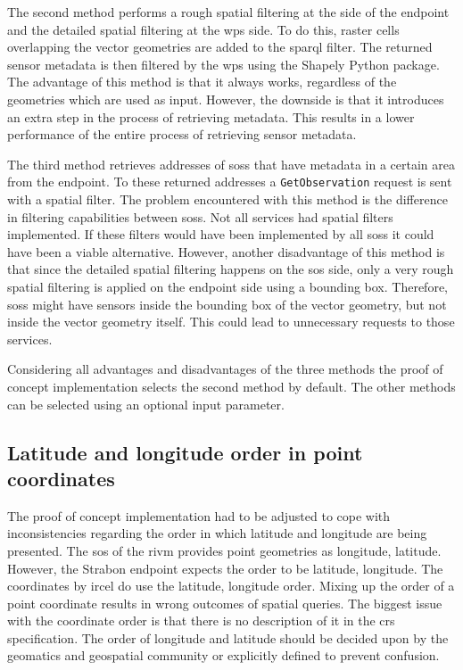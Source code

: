 The second method performs a rough spatial filtering at the side of the endpoint and the detailed spatial filtering at the \ac{wps} side. To do this, raster cells overlapping the vector geometries are added to the \ac{sparql} filter. The returned sensor metadata is then filtered by the \ac{wps} using the Shapely Python package. The advantage of this method is that it always works, regardless of the geometries which are used as input. However, the downside is that it introduces an extra step in the process of retrieving metadata. This results in a lower performance of the entire process of retrieving sensor metadata.  

The third method retrieves addresses of \aclp{sos} that have metadata in a certain area from the endpoint. To these returned addresses a \texttt{GetObservation} request is sent with a spatial filter. The problem encountered with this method is the difference in filtering capabilities between \aclp{sos}. Not all services had spatial filters implemented. If these filters would have been implemented by all \aclp{sos} it could have been a viable alternative. However, another disadvantage of this method is that since the detailed spatial filtering happens on the \ac{sos} side, only a very rough spatial filtering is applied on the endpoint side using a bounding box. Therefore, \aclp{sos} might have sensors inside the bounding box of the vector geometry, but not inside the vector geometry itself. This could lead to unnecessary requests to those services.

Considering all advantages and disadvantages of the three methods the proof of concept implementation selects the second method by default. The other methods can be selected using an optional input parameter. 

\subsection{Latitude and longitude order in point coordinates}
The proof of concept implementation had to be adjusted to cope with inconsistencies regarding the order in which latitude and longitude are being presented. The \ac{sos} of the \ac{rivm} provides point geometries as longitude, latitude. However, the Strabon endpoint expects the order to be latitude, longitude. The coordinates by \ac{ircel} do use the latitude, longitude order. Mixing up the order of a point coordinate results in wrong outcomes of spatial queries. The biggest issue with the coordinate order is that there is no description of it in the \ac{crs} specification.  The order of longitude and latitude should be decided upon by the geomatics and geospatial community or explicitly defined to prevent confusion. 

